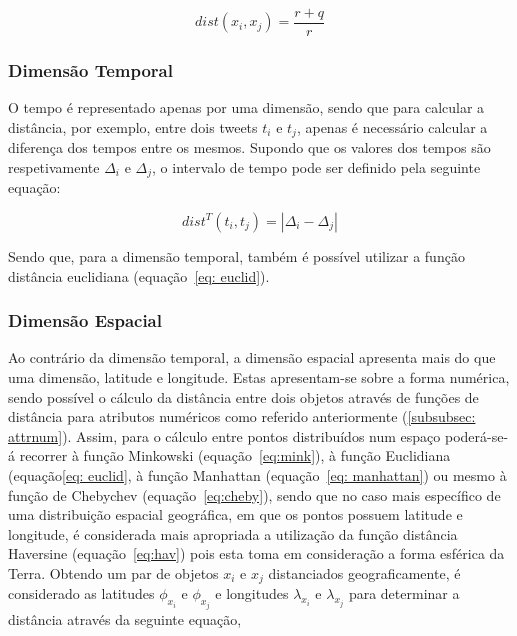 \begin{equation}
 dist(x_{i}, x_{j}) =  \frac{r + q}{r}
\end{equation}

\subsubsection{Dimensão Temporal}

O tempo é representado apenas por uma dimensão, sendo que para calcular a distância, por exemplo, entre dois tweets $ t_{i} $ e $ t_{j} $, apenas é necessário calcular a diferença dos tempos entre os mesmos. Supondo que os valores dos tempos são respetivamente $ \Delta_{i} $ e $ \Delta_{j} $, o intervalo de tempo pode ser definido pela seguinte equação:

\begin{equation}
dist^{T}( t_{i}, t_{j}) = |\Delta_{i} - \Delta_{j}|  
\end{equation}

Sendo que, para a dimensão temporal, também é possível utilizar a função distância euclidiana (equação~\ref{eq: euclid}).

\subsubsection{Dimensão Espacial}

Ao contrário da dimensão temporal, a dimensão espacial apresenta mais do que uma dimensão, latitude e longitude. Estas apresentam-se sobre a forma numérica, sendo possível o cálculo da distância entre dois objetos através de funções de distância para atributos numéricos como referido anteriormente (\ref{subsubsec: attrnum}). Assim, para o cálculo entre pontos distribuídos num espaço poderá-se-á recorrer à função Minkowski (equação~\ref{eq:mink}), à função Euclidiana (equação\ref{eq: euclid}, à função Manhattan (equação~\ref{eq: manhattan}) ou mesmo à função de Chebychev (equação~\ref{eq:cheby}), sendo que no caso mais específico de uma distribuição espacial geográfica, em que os pontos possuem latitude e longitude, é considerada mais apropriada a utilização da função distância Haversine (equação~\ref{eq:hav}) pois esta toma em consideração a forma esférica da Terra.
Obtendo um par de objetos $ x_{i} $ e $ x_{j} $ distanciados geograficamente, é considerado as latitudes $ \phi_{x_{i}} $ e $ \phi_{x_{j}} $ e longitudes $ \lambda_{x_{i}} $ e $ \lambda_{x_{j}} $ para determinar a distância através da seguinte equação,

